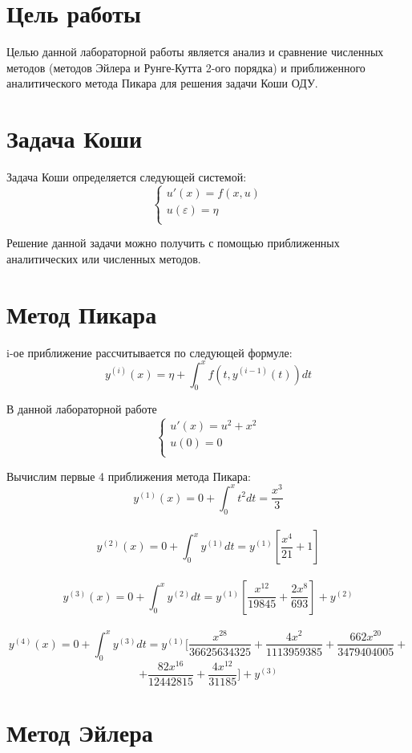 
\section*{Цель работы}
Целью данной лабораторной работы является анализ и сравнение численных методов (методов Эйлера и Рунге-Кутта 2-ого порядка) и приближенного аналитического метода Пикара для решения задачи Коши ОДУ. 




\section*{Задача Коши}
Задача Коши определяется следующей системой:
$$
\left\{\begin{matrix}
	u'(x) = f(x, u)\\ 
	u(\varepsilon) = \eta \\
\end{matrix}\right.
$$

Решение данной задачи можно получить с помощью приближенных аналитических или численных методов.


\section*{Метод Пикара}

i-ое приближение рассчитывается по следующей формуле:\\
$$y^{(i)}(x) = \eta + \int_{0}^{x}{f(t, y^{(i-1)}(t))dt}$$

В данной лабораторной работе 
$$
\left\{\begin{matrix}
	u'(x) = u^2 + x^2\\ 
	u(0) = 0 \\
\end{matrix}\right.
$$

Вычислим первые 4 приближения метода Пикара:
$$y^{(1)}(x) = 0 + \int_{0}^{x}{t^2 dt} = \frac{x^3}{3}$$\\
$$y^{(2)}(x) = 0 + \int_{0}^{x}{y^{(1)}dt} = y^{(1)} [ \frac{x^4}{21} + 1]$$\\
$$y^{(3)}(x) = 0 + \int_{0}^{x}{y^{(2)}dt} = y^{(1)} [ \frac{x^{12}}{19845} + \frac{2x^8}{693}] + y^{(2)}$$\\
$$y^{(4)}(x) = 0 + \int_{0}^{x}{y^{(3)}dt} = y^{(1)} [ \frac{x^{28}}{36 625 634 325} + \frac{4x^{2}}{1 113 959 385} + \frac{662x^{20}}{3 479 404 005} + $$
$$ + \frac{82x^{16}}{12 442 815} + \frac{4x^{12}}{31185}] + y^{(3)}$$


\section*{Метод Эйлера}

